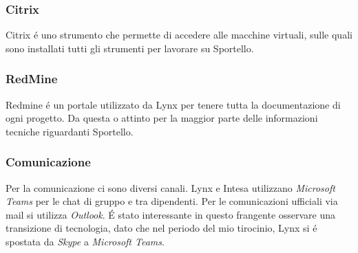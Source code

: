 \subsubsection{Citrix}
Citrix é uno strumento che permette di accedere alle macchine virtuali, sulle quali sono installati tutti gli strumenti per lavorare su Sportello. 

\subsubsection{RedMine}
Redmine é un portale utilizzato da Lynx per tenere tutta la documentazione di ogni progetto. Da questa o attinto per la maggior parte delle informazioni tecniche riguardanti Sportello.

\subsubsection{Comunicazione}
Per la comunicazione ci sono diversi canali. Lynx e Intesa utilizzano \textit{Microsoft Teams} per le chat di gruppo e tra dipendenti. Per le comunicazioni ufficiali via mail si utilizza \textit{Outlook}. É stato interessante in questo frangente osservare una transizione di tecnologia, dato che nel periodo del mio tirocinio, Lynx si é spostata da \textit{Skype} a \textit{Microsoft Teams}.
